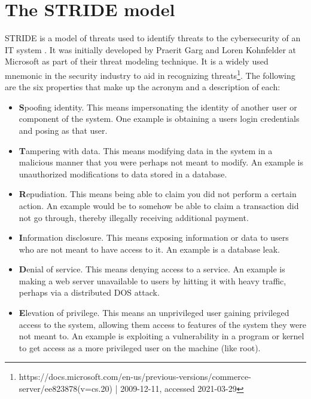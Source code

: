 \section{The STRIDE model} \label{ch:method:stride}
STRIDE is a model of threats used to identify threats to the cybersecurity of an IT system \cite{stride}. It was initially developed by Praerit Garg and Loren Kohnfelder at Microsoft as part of their threat modeling technique. It is a widely used mnemonic in the security industry to aid in recognizing threats\footnote{https://docs.microsoft.com/en-us/previous-versions/commerce-server/ee823878(v=cs.20) | 2009-12-11, accessed 2021-03-29}. The following are the six properties that make up the acronym and a description of each:
\begin{itemize}
    \item \textbf{S}poofing identity. This means impersonating the identity of another user or component of the system. One example is obtaining a users login credentials and posing as that user.
    \item \textbf{T}ampering with data. This means modifying data in the system in a malicious manner that you were perhaps not meant to modify. An example is unauthorized modifications to data stored in a database.
    \item \textbf{R}epudiation. This means being able to claim you did not perform a certain action. An example would be to somehow be able to claim a transaction did not go through, thereby illegally receiving additional payment.
    \item \textbf{I}nformation disclosure. This means exposing information or data to users who are not meant to have access to it. An example is a database leak.
    \item \textbf{D}enial of service. This means denying access to a service. An example is making a web server unavailable to users by hitting it with heavy traffic, perhaps via a distributed \gls{DOS} attack.
    \item \textbf{E}levation of privilege. This means an unprivileged user gaining privileged access to the system, allowing them access to features of the system they were not meant to. An example is exploiting a vulnerability in a program or kernel to get access as a more privileged user on the machine (like root).
\end{itemize}